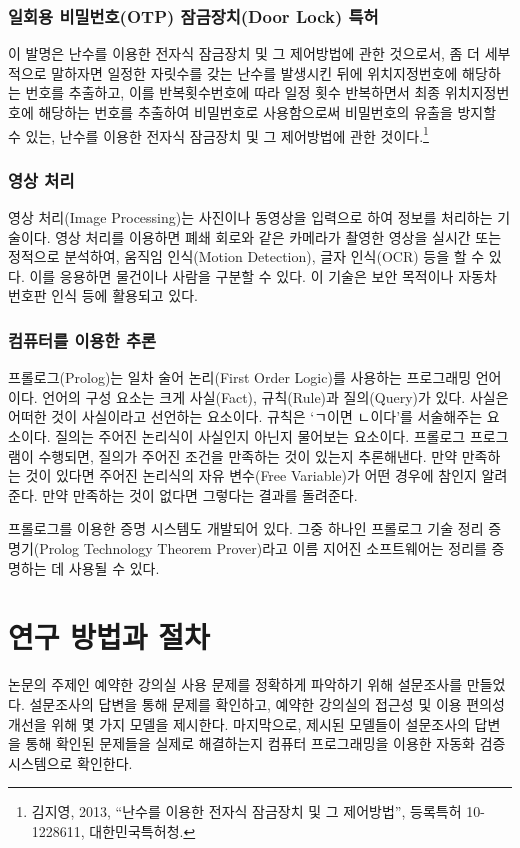 \documentclass[11pt,a4paper]{article}
\begin{document}
\subsubsection{일회용 비밀번호(OTP) 잠금장치(Door Lock) 특허}
이 발명은 난수를 이용한 전자식 잠금장치 및 그 제어방법에 관한 것으로서, 좀 더
세부적으로 말하자면 일정한 자릿수를 갖는 난수를 발생시킨 뒤에 위치지정번호에
해당하는 번호를 추출하고, 이를 반복횟수번호에 따라 일정 횟수 반복하면서 최종
위치지정번호에 해당하는 번호를 추출하여 비밀번호로 사용함으로써 비밀번호의
유출을 방지할 수 있는, 난수를 이용한 전자식 잠금장치 및 그 제어방법에 관한
것이다.\footnote{김지영, 2013, ``난수를 이용한 전자식 잠금장치 및 그 제어방법'',
등록특허 10-1228611, 대한민국특허청.}

\subsubsection{영상 처리}
영상 처리(Image Processing)는 사진이나 동영상을 입력으로 하여 정보를 처리하는
기술이다. 영상 처리를 이용하면 폐쇄 회로와 같은 카메라가 촬영한 영상을 실시간
또는 정적으로 분석하여, 움직임 인식(Motion Detection), 글자 인식(OCR) 등을 할
수 있다. 이를 응용하면 물건이나 사람을 구분할 수 있다. 이 기술은 보안 목적이나
자동차 번호판 인식 등에 활용되고 있다.

\subsubsection{컴퓨터를 이용한 추론}
프롤로그(Prolog)는 일차 술어 논리(First Order Logic)를 사용하는 프로그래밍
언어이다. 언어의 구성 요소는 크게 사실(Fact), 규칙(Rule)과 질의(Query)가 있다.
사실은 어떠한 것이 사실이라고 선언하는 요소이다. 규칙은 ‘ㄱ이면 ㄴ이다’를
서술해주는 요소이다. 질의는 주어진 논리식이 사실인지 아닌지 물어보는 요소이다.
프롤로그 프로그램이 수행되면, 질의가 주어진 조건을 만족하는 것이 있는지
추론해낸다. 만약 만족하는 것이 있다면 주어진 논리식의 자유 변수(Free
Variable)가 어떤 경우에 참인지 알려준다. 만약 만족하는 것이 없다면 그렇다는
결과를 돌려준다.

프롤로그를 이용한 증명 시스템도 개발되어 있다. 그중 하나인 프롤로그 기술 정리
증명기(Prolog Technology Theorem Prover)라고 이름 지어진 소프트웨어는 정리를
증명하는 데 사용될 수 있다.

\section{연구 방법과 절차}
논문의 주제인 예약한 강의실 사용 문제를 정확하게 파악하기 위해 설문조사를
만들었다. 설문조사의 답변을 통해 문제를 확인하고, 예약한 강의실의 접근성 및
이용 편의성 개선을 위해 몇 가지 모델을 제시한다. 마지막으로, 제시된 모델들이
설문조사의 답변을 통해 확인된 문제들을 실제로 해결하는지 컴퓨터 프로그래밍을
이용한 자동화 검증 시스템으로 확인한다.
\end{document}
